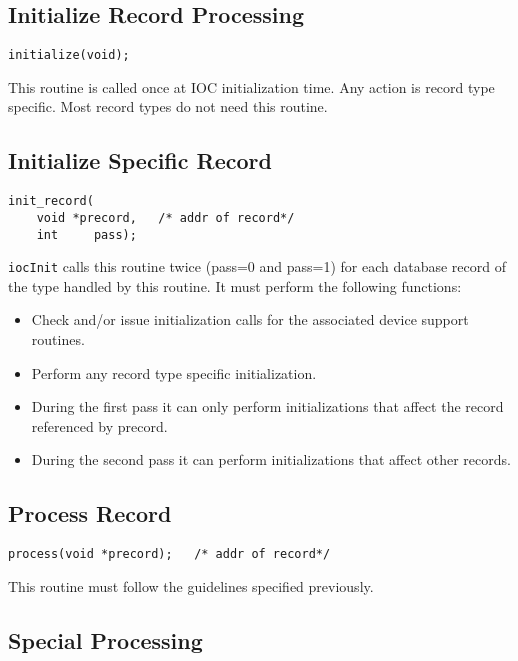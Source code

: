 \subsection{Initialize Record Processing}

\begin{verbatim}initialize(void);
\end{verbatim}This routine is called once at IOC initialization time. Any action is record type specific. Most record types do not need 
this routine.

\subsection{Initialize Specific Record}

\begin{verbatim}
init_record(
    void *precord,   /* addr of record*/
    int     pass);
\end{verbatim}\verb|iocInit| calls this routine twice (pass=0 and pass=1) for each database record of the type handled by this routine. It must 
perform the following functions:

\begin{itemize}\item Check and/or issue initialization calls for the associated device support routines.

\item Perform any record type specific initialization.

\item During the first pass it can only perform initializations that affect the record referenced by precord. 

\item During the second pass it can perform initializations that affect other records.

\end{itemize}\subsection{Process Record}

\begin{verbatim}process(void *precord);   /* addr of record*/
\end{verbatim}This routine must follow the guidelines specified previously.

\subsection{Special Processing}

